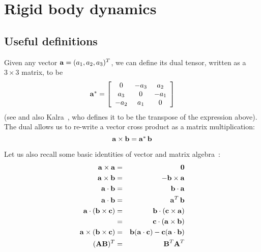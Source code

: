 \section{Rigid body dynamics\label{rigidBodyAppendix}}
\subsection{Useful definitions}

Given any vector $\ve{a} = (a_1, a_2, a_3)^T$, we can define its dual
tensor, written as a $3\times3$ matrix, to be
\begin{equation}
\dual{\ve{a}} = \left[\begin{array}{ccc}
    0 & -a_3 & a_2 \\ a_3 & 0 & -a_1 \\ -a_2 & a_1 & 0
    \end{array}\right]
\end{equation}
(see \cite{RHB:02,BaraffWitkin:97} and also Kalra~\cite{Kalra:95}, who defines it to be
the transpose of the expression above).
The dual allows us to re-write a vector cross product as a matrix multiplication:
\begin{equation}
\ve{a}\times\ve{b} = \dual{\ve{a}}\,\ve{b}
\end{equation}

Let us also recall some basic identities of vector and matrix algebra~\cite{RHB:02}:
\begin{eqnarray*}
\ve{a}\times\ve{a} & = & \ve{0} \\
\ve{a}\times\ve{b} & = & -\ve{b}\times\ve{a} \\
\ve{a}\cdot\ve{b} & = & \ve{b}\cdot\ve{a} \\
\ve{a}\cdot\ve{b} & = & \ve{a}^T\,\ve{b} \\
\ve{a}\cdot(\ve{b}\times\ve{c}) & = & \ve{b}\cdot(\ve{c}\times\ve{a}) \\
    & = & \ve{c}\cdot(\ve{a}\times\ve{b}) \\
\ve{a}\times(\ve{b}\times\ve{c}) & = &
    \ve{b}(\ve{a}\cdot\ve{c}) - \ve{c}(\ve{a}\cdot\ve{b}) \\
(\m{A}\m{B})^T & = & \m{B}^T\m{A}^T
\end{eqnarray*}


